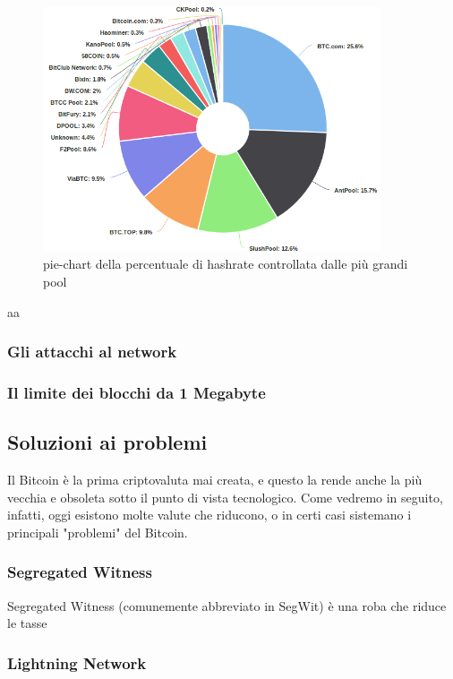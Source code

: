 \documentclass {article}
\begin{document}
\vspace {0.5cm}
\begin{figure}
\includegraphics [width = 10cm] {pools.png}
\centering
\caption {pie-chart della percentuale di hashrate controllata dalle più grandi pool}
\end{figure}
\vspace {0.2cm}
\noindent
%
aa


\subsubsection {Gli attacchi al network} %


\subsubsection {Il limite dei blocchi da 1 Megabyte}



\subsection {Soluzioni ai problemi}


Il Bitcoin è la prima criptovaluta mai creata, e questo la rende anche la più vecchia e obsoleta sotto il punto di vista tecnologico. Come vedremo in seguito, infatti, oggi esistono molte valute che riducono, o in certi casi sistemano i principali "problemi" del Bitcoin.


\subsubsection {Segregated Witness}


Segregated Witness (comunemente abbreviato in SegWit) è una roba che riduce le tasse


\subsubsection {Lightning Network}
\end{document}
